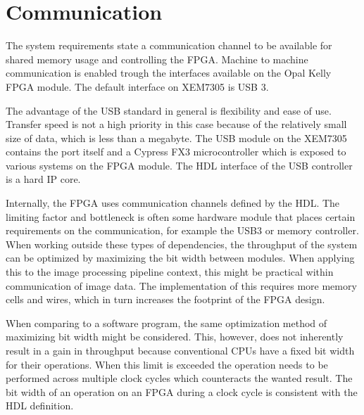 \documentclass[12pt]{report}
\begin{document}
\section{Communication}
The system requirements state a communication channel to be available for shared memory usage and controlling the FPGA. Machine to machine communication is enabled trough the interfaces available on the Opal Kelly FPGA module. The default interface on XEM7305 is USB 3.
\par
The advantage of the USB standard in general is flexibility and ease of use. Transfer speed is not a high priority in this case because of the relatively small size of data, which is less than a megabyte. The USB module on the XEM7305 contains the port itself and a Cypress FX3 microcontroller which is exposed to various systems on the FPGA module. The HDL interface of the USB controller is a hard IP core.
\par
Internally, the FPGA uses communication channels defined by the HDL. The limiting factor and bottleneck is often some hardware module that places certain requirements on the communication, for example the USB3 or memory controller. When working outside these types of dependencies, the throughput of the system can be optimized by maximizing the bit width between modules. When applying this to the image processing pipeline context, this might be practical within communication of image data. The implementation of this requires more memory cells and wires, which in turn increases the footprint of the FPGA design.
\par
When comparing to a software program, the same optimization method of maximizing bit width might be considered. This, however, does not inherently result in a gain in throughput because conventional CPUs have a fixed bit width for their operations. When this limit is exceeded the operation needs to be performed across multiple clock cycles which counteracts the wanted result. The bit width of an operation on an FPGA during a clock cycle is consistent with the HDL definition. 

\end{document}

